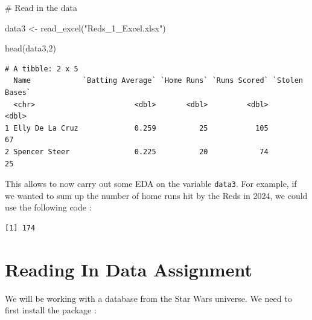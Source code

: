 \documentclass[
  letterpaper,
  DIV=11,
  numbers=noendperiod]{scrreprt}
\newenvironment{Shaded}{\begin{snugshade}}{\end{snugshade}}
\newcommand{\AttributeTok}[1]{\textcolor[rgb]{0.40,0.45,0.13}{#1}}
\newcommand{\CommentTok}[1]{\textcolor[rgb]{0.37,0.37,0.37}{#1}}
\newcommand{\DecValTok}[1]{\textcolor[rgb]{0.68,0.00,0.00}{#1}}
\newcommand{\FunctionTok}[1]{\textcolor[rgb]{0.28,0.35,0.67}{#1}}
\newcommand{\NormalTok}[1]{\textcolor[rgb]{0.00,0.23,0.31}{#1}}
\newcommand{\OtherTok}[1]{\textcolor[rgb]{0.00,0.23,0.31}{#1}}
\newcommand{\SpecialCharTok}[1]{\textcolor[rgb]{0.37,0.37,0.37}{#1}}
\newcommand{\StringTok}[1]{\textcolor[rgb]{0.13,0.47,0.30}{#1}}
\begin{document}
\begin{Shaded}
\begin{Highlighting}[]
\CommentTok{\# Read in the data}

\NormalTok{data3 }\OtherTok{\textless{}{-}} \FunctionTok{read\_excel}\NormalTok{(}\StringTok{"Reds\_1\_Excel.xlsx"}\NormalTok{)}

\FunctionTok{head}\NormalTok{(data3,}\DecValTok{2}\NormalTok{)}
\end{Highlighting}
\end{Shaded}

\begin{verbatim}
# A tibble: 2 x 5
  Name            `Batting Average` `Home Runs` `Runs Scored` `Stolen Bases`
  <chr>                       <dbl>       <dbl>         <dbl>          <dbl>
1 Elly De La Cruz             0.259          25           105             67
2 Spencer Steer               0.225          20            74             25
\end{verbatim}

This allows to now carry out some EDA on the variable \texttt{data3}.
For example, if we wanted to sum up the number of home runs hit by the
Reds in 2024, we could use the following code :

\begin{Shaded}
\end{Shaded}

\begin{verbatim}
[1] 174
\end{verbatim}


\chapter*{Reading In Data Assignment}\label{reading-in-data-assignment}


We will be working with a database from the Star Wars universe. We need
to first install the package :
\end{document}
